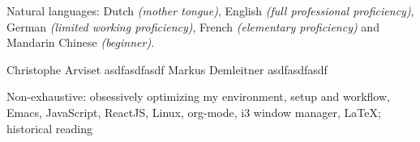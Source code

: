 \documentclass[10pt,a4paper]{article} %
\begin{document}

\inlineheadsection %
{Natural languages:}
{Dutch \textit{(mother tongue)}, English \textit{(full professional proficiency)}, German \textit{(limited working proficiency)}, French \textit{(elementary proficiency)} and Mandarin Chinese \textit{(beginner)}.}

\spacedhrule{1.6em}{-0.4em} %



  \inlineheadsection
      {Christophe Arviset}
      {asdfasdfasdf}
  \inlineheadsection
      {Markus Demleitner}
      {asdfasdfasdf}

\spacedhrule{1.6em}{-0.4em} %


\inlineheadsection %
{Non-exhaustive:}
{obsessively optimizing my environment, setup and workflow, Emacs, JavaScript, ReactJS, Linux, org-mode, i3 window manager, \LaTeX; historical reading}

\end{document}
